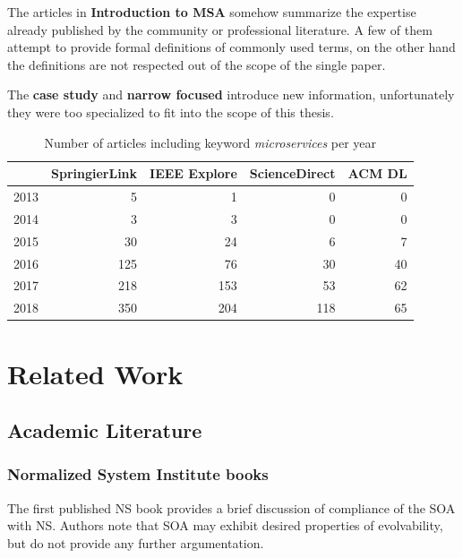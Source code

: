 \documentclass[thesis=M,english,hidelinks]{FITthesis}[2012/10/20]
\begin{document}
The articles in \textbf{Introduction to \acrshort{MSA}} somehow summarize the expertise already published by the community or professional literature. A few of them attempt to provide formal definitions of commonly used terms, on the other hand the definitions are not respected out of the scope of the single paper.

The \textbf{case study} and \textbf{narrow focused} introduce new information, unfortunately they were too specialized to fit into the scope of this thesis.

\begin{table}[b]
\centering
\caption{Number of articles including keyword \textit{microservices} per year}
\label{tab:ms_trends}
\begin{tabular}{r|r|r|r|r}
              & \textbf{SpringierLink}  & \textbf{IEEE Explore} & \textbf{ScienceDirect} & \textbf{ACM DL}                \\ 
\hline
2013 & 5                       &  1                    & 0                       & 0                             \\ 
\hline
2014 & 3                       &  3                    & 0                       & 0                             \\ 
\hline
2015 & 30                      & 24                    & 6                       & 7                             \\ 
\hline
2016 & 125                     & 76                    & 30                      & 40                            \\ 
\hline
2017 & 218                     & 153                   & 53                      & 62                            \\ 
\hline
2018 & 350                     & 204                   & 118                     & 65                           
\end{tabular}
\end{table}

% 
% 
\section{Related Work}
\label{sec:related_work}
\subsection{Academic Literature}
\subsubsection*{Normalized System Institute books}
The first published \acrshort{NS} book \cite{ns-recreating} provides a brief discussion of compliance of the \acrfull{SOA} with \acrshort{NS}. Authors note that \acrshort{SOA} may exhibit desired properties of evolvability, but do not provide any further argumentation.
\end{document}
